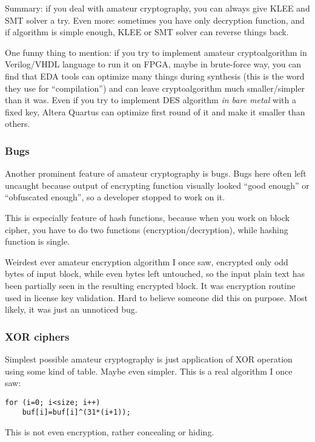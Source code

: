 Summary: if you deal with amateur cryptography, you can always give KLEE and SMT solver a try.
Even more: sometimes you have only decryption function, and if algorithm is simple enough,
KLEE or SMT solver can reverse things back.

One funny thing to mention: if you try to implement amateur cryptoalgorithm in Verilog/VHDL language to run it on \ac{FPGA},
maybe in brute-force way,
you can find that \ac{EDA} tools can optimize many things during synthesis
(this is the word they use for ``compilation'') and can leave cryptoalgorithm much smaller/simpler than it was.
Even if you try to implement DES algorithm \textit{in bare metal} with a fixed key,
Altera Quartus can optimize first round of it and make it smaller than others.

\subsubsection{Bugs}

Another prominent feature of amateur cryptography is bugs.
Bugs here often left uncaught because output of encrypting function visually looked ``good enough'' or ``obfuscated enough'',
so a developer stopped to work on it.

This is especially feature of hash functions, because when you work on block cipher, you have to do two functions
(encryption/decryption), while hashing function is single.

Weirdest ever amateur encryption algorithm I once saw, encrypted only odd bytes of input block, while even bytes
left untouched, so the input plain text has been partially seen in the resulting encrypted block.
It was encryption routine used in license key validation.
Hard to believe someone did this on purpose.
Most likely, it was just an unnoticed bug.

\subsubsection{XOR ciphers}

Simplest possible amateur cryptography is just application of XOR operation using some kind of table.
Maybe even simpler. This is a real algorithm I once saw:

\begin{lstlisting}
for (i=0; i<size; i++)
    buf[i]=buf[i]^(31*(i+1));
\end{lstlisting}

This is not even encryption, rather concealing or hiding.

